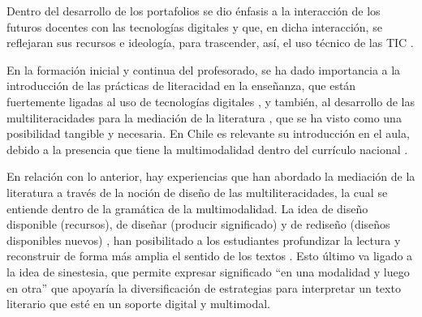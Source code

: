 Dentro del desarrollo de los portafolios se dio énfasis a la interacción
de los futuros docentes con las tecnologías digitales y que, en dicha
interacción, se reflejaran sus recursos e ideología, para trascender,
así, el uso técnico de las TIC \cite{dowdall2021digital}.

En la formación inicial y continua del profesorado, se ha dado
importancia a la introducción de las prácticas de literacidad en la
enseñanza, que están fuertemente ligadas al uso de tecnologías digitales
\cite{thibaut_2020}, y también, al desarrollo de las multiliteracidades para
la mediación de la literatura \cite{godoy2023,cabrerocafort2021}, que
se ha visto como una posibilidad tangible y necesaria. En Chile es
relevante su introducción en el aula, debido a la presencia que tiene la
multimodalidad dentro del currículo nacional \cite{meneses_literacidad_2023}.

En relación con lo anterior, hay experiencias que han abordado la
mediación de la literatura a través de la noción de diseño de las
multiliteracidades, la cual se entiende dentro de la gramática de la
multimodalidad. La idea de diseño disponible (recursos), de diseñar
(producir significado) y de rediseño (diseños disponibles nuevos)
\cite{kalantzis_cope_new_learning}, han posibilitado a los estudiantes profundizar
la lectura y reconstruir de forma más amplia el sentido de los textos
\cite{Fernandes_2018}. Esto último va ligado a la idea de sinestesia, que
permite expresar significado ``en una modalidad y luego en otra''
\cite[p. 244]{kalantzis2019} que apoyaría la diversificación
de estrategias para interpretar un texto literario que esté en un
soporte digital y multimodal.

